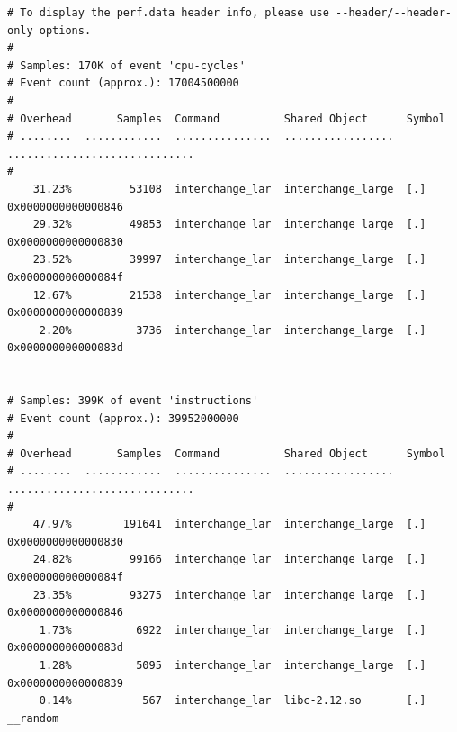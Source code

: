 \documentclass[conference,compsoc]{IEEEtran}
\begin{document}
\begin{lstlisting}
# To display the perf.data header info, please use --header/--header-only options.
#
# Samples: 170K of event 'cpu-cycles'
# Event count (approx.): 17004500000
#
# Overhead       Samples  Command          Shared Object      Symbol                       
# ........  ............  ...............  .................  .............................
#
    31.23%         53108  interchange_lar  interchange_large  [.] 0x0000000000000846       
    29.32%         49853  interchange_lar  interchange_large  [.] 0x0000000000000830       
    23.52%         39997  interchange_lar  interchange_large  [.] 0x000000000000084f       
    12.67%         21538  interchange_lar  interchange_large  [.] 0x0000000000000839       
     2.20%          3736  interchange_lar  interchange_large  [.] 0x000000000000083d       


# Samples: 399K of event 'instructions'
# Event count (approx.): 39952000000
#
# Overhead       Samples  Command          Shared Object      Symbol                       
# ........  ............  ...............  .................  .............................
#
    47.97%        191641  interchange_lar  interchange_large  [.] 0x0000000000000830       
    24.82%         99166  interchange_lar  interchange_large  [.] 0x000000000000084f       
    23.35%         93275  interchange_lar  interchange_large  [.] 0x0000000000000846       
     1.73%          6922  interchange_lar  interchange_large  [.] 0x000000000000083d       
     1.28%          5095  interchange_lar  interchange_large  [.] 0x0000000000000839       
     0.14%           567  interchange_lar  libc-2.12.so       [.] __random                 



\end{lstlisting}
\end{document}

